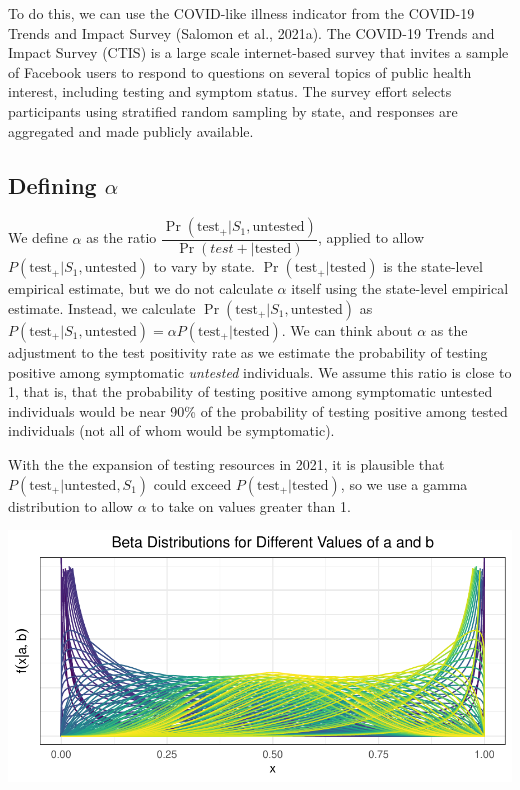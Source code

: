 \documentclass[12pt,twoside]{smiththesis}
\begin{document}
To do this, we can use the COVID-like illness indicator from the COVID-19 Trends and Impact Survey (Salomon et al., 2021a). The COVID-19 Trends and Impact Survey (CTIS) is a large scale internet-based survey that invites a sample of Facebook users to respond to questions on several topics of public health interest, including testing and symptom status. The survey effort selects participants using stratified random sampling by state, and responses are aggregated and made publicly available.

\hypertarget{defining-alpha}{%
\subsection{\texorpdfstring{Defining \(\alpha\)}{Defining \textbackslash alpha}}\label{defining-alpha}}

We define \(\alpha\) as the ratio \(\dfrac{\Pr(\text{test}_+|S_1, \text{untested})}{\Pr(test+|\text{tested})}\), applied to allow
\(P(\text{test}_+|S_1, \text{untested})\) to vary by state. \(\Pr(\text{test}_+|\text{tested})\) is the state-level empirical estimate, but we do not calculate \(\alpha\) itself using the state-level empirical estimate. Instead, we calculate \(\Pr(\text{test}_+|S_1, \text{untested})\) as \(P(\text{test}_+|S_1, \text{untested}) =\alpha P(\text{test}_+|\text{tested})\). We can think about \(\alpha\) as the adjustment to the test positivity rate as we estimate the probability of testing positive among symptomatic \emph{untested} individuals. We assume this ratio is close to 1, that is, that the probability of testing positive among symptomatic untested individuals would be near 90\% of the probability of testing positive among tested individuals (not all of whom would be symptomatic).

With the the expansion of testing resources in 2021, it is plausible that \(P(\text{test}_+|\text{untested},S_1)\) could exceed \(P(\text{test}_+|\text{tested})\), so we use a gamma distribution to allow \(\alpha\) to take on values greater than 1.
\begin{center}\includegraphics[width=0.8\linewidth]{thesis_files/figure-latex/unnamed-chunk-44-1} \end{center}
\end{document}
